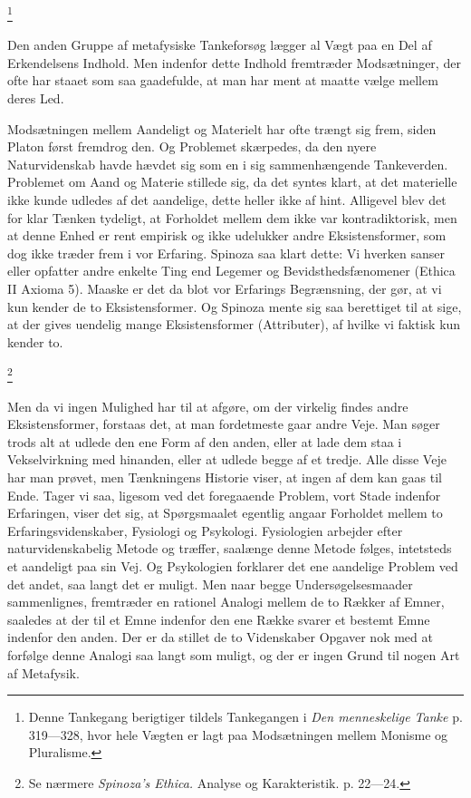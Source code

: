 \documentclass[12pt]{article}
\newcommand{\apage}[1]{\marginnote{\footnotesize\textit{[#1]}}}
\begin{document}
         \footnote{Denne Tankegang berigtiger tildels Tankegangen i \textit{Den
menneskelige Tanke} p. 319---328, hvor hele Vægten er lagt paa Modsætningen
mellem Monisme og Pluralisme.}

\setcounter{footnote}{0}%
\apage{90}Den anden Gruppe af metafysiske Tankeforsøg lægger al Vægt paa en Del
af Erkendelsens Indhold. Men indenfor dette Indhold fremtræder Modsætninger,
der ofte har staaet som saa gaadefulde, at man har ment at maatte vælge mellem
deres Led.

Modsætningen mellem Aandeligt og Materielt har ofte trængt sig frem, siden
Platon først fremdrog den. Og Problemet skærpedes, da den nyere Naturvidenskab
havde hævdet sig som en i sig sammenhængende Tankeverden. Problemet om Aand og
Materie stillede sig, da det syntes klart, at det materielle ikke kunde udledes
af det aandelige, dette heller ikke af hint. Alligevel blev det for klar Tænken
tydeligt, at Forholdet mellem dem ikke var kontradiktorisk, men at denne Enhed
er rent empirisk og ikke udelukker andre Eksistensformer, som dog ikke træder
frem i vor Erfaring. Spinoza saa klart dette: \guillemotright{}Vi hverken
sanser eller opfatter andre enkelte Ting end Legemer og
Bevidsthedsfænomener\guillemotleft{} (Ethica II Axioma 5). Maaske er det da
blot vor Erfarings Begrænsning, der gør, at vi kun kender de to
Eksistensformer. Og Spinoza mente sig saa berettiget til at sige, at der gives
uendelig mange Eksistensformer (\guillemotright{}Attributer\guillemotleft{}),
af hvilke vi faktisk kun kender to.

         \footnote{Se nærmere \textit{Spinoza's Ethica.} Analyse og
Karakteristik. p. 22---24.}

       Men da vi ingen Mulighed har til at afgøre, om der virkelig findes andre
Eksistensformer, forstaas det, at man fordetmeste gaar andre Veje. Man søger
trods alt at udlede den ene Form af den anden, eller at lade dem staa i
Vekselvirkning med hinanden, eller at udlede begge af et tredje. Alle disse
Veje har man prøvet, men Tænkningens Historie viser, at ingen af dem kan gaas
til Ende. Tager vi saa, ligesom ved det foregaaende Problem, vort Stade
indenfor Erfaringen, viser det sig, at Spørgsmaalet egentlig
\setcounter{footnote}{0}%
\apage{91}angaar Forholdet mellem to Erfaringsvidenskaber, Fysiologi og
Psykologi. Fysiologien arbejder efter naturvidenskabelig Metode og træffer,
saalænge denne Metode følges, intetsteds et aandeligt paa sin Vej. Og
Psykologien forklarer det ene aandelige Problem ved det andet, saa langt det er
muligt. Men naar begge Undersøgelsesmaader sammenlignes, fremtræder en rationel
Analogi mellem de to Rækker  af Emner, saaledes at der til et Emne indenfor den
ene Række svarer et bestemt Emne indenfor den anden. Der er da stillet de to
Videnskaber Opgaver nok med at forfølge denne Analogi saa langt som muligt, og
der er ingen Grund til nogen Art af Metafysik.
\end{document}
